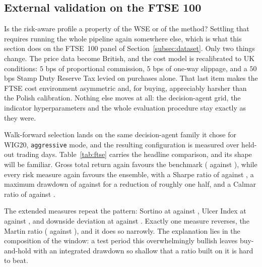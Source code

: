 \subsection{External validation on the FTSE 100}\label{subsec:ftse}

Is the risk-aware profile a property of the WSE or of the method? Settling that requires running the whole pipeline again somewhere else, which is what this section does on the FTSE~100 panel of Section~\ref{subsec:dataset}. Only two things change. The price data become British, and the cost model is recalibrated to UK conditions: $5$ bps of proportional commission, $5$ bps of one-way slippage, and a $50$ bps Stamp Duty Reserve Tax levied on purchases alone. That last item makes the FTSE cost environment asymmetric and, for buying, appreciably harsher than the Polish calibration. Nothing else moves at all: the decision-agent grid, the indicator hyperparameters and the whole evaluation procedure stay exactly as they were.

Walk-forward selection lands on the same decision-agent family it chose for WIG20, \texttt{aggressive} mode, and the resulting configuration is measured over \FtseOOSDays{} held-out trading days. Table~\ref{tab:ftse} carries the headline comparison, and its shape will be familiar. Gross total return again favours the benchmark (\FtseTRtest{} against \FtseBHtest{}), while every risk measure again favours the ensemble, with a Sharpe ratio of \FtseSharpe{} against \FtseBHsharpe{}, a maximum drawdown of \FtseMDD{} against \FtseBHmdd{} for a reduction of roughly one half, and a Calmar ratio of \FtseCalmar{} against \FtseBHcalmar{}.

The extended measures repeat the pattern: Sortino at \FtseEnsSortino{} against \FtseBHSortino{}, Ulcer Index at \FtseEnsUlcer{} against \FtseBHUlcer{}, and downside deviation at \FtseEnsDownDev{} against \FtseBHDownDev{}. Exactly one measure reverses, the Martin ratio (\FtseEnsMartin{} against \FtseBHMartin{}), and it does so narrowly. The explanation lies in the composition of the window: a test period this overwhelmingly bullish leaves buy-and-hold with an integrated drawdown so shallow that a ratio built on it is hard to beat.

